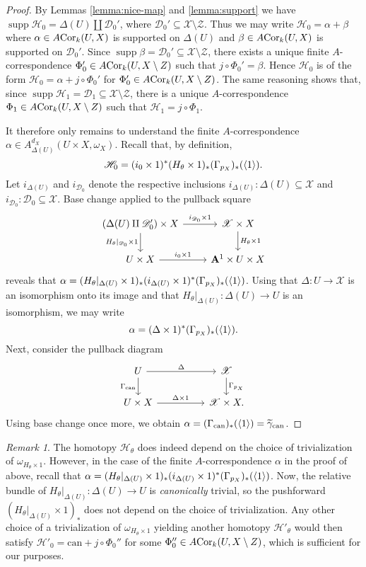\documentclass[a4paper, oneside, english,reqno]{amsart}
\DeclarePairedDelimiter{\ip}{\langle}{\rangle}
\theoremstyle{plain}
\theoremstyle{definition}
\theoremstyle{remark}
\newtheorem{remark}[theorem]{Remark}
\newcommand{\wt}{\widetilde}
\newcommand{\ACor}{A\mkern-3mu\Cor}
\newcommand{\A}{\mathbf{A}}
\newcommand{\scrD}{\mathscr{D}}
\newcommand{\scrH}{\mathscr{H}}
\newcommand{\scrX}{\mathscr{X}}
\newcommand{\scrZ}{\mathscr{Z}}
\newcommand{\can}{\mathrm{can}}
\DeclareMathOperator{\supp}{supp}
\DeclareMathOperator{\Cor}{Cor}
\begin{document}
\begin{proof}
By Lemmas \ref{lemma:nice-map} and \ref{lemma:support} we have $\supp\scrH_0=\Delta(U)\amalg\scrD_0'$, where $\scrD_0'\subseteq\scrX\setminus\scrZ$. Thus we may write $\scrH_0=\alpha+\beta$ where $\alpha\in\ACor_k(U,X)$ is supported on $\Delta(U)$ and $\beta\in\ACor_k(U,X)$ is supported on $\scrD_0'$. Since $\supp\beta=\scrD_0'\subseteq\scrX\setminus\scrZ$, there exists  a unique finite $A$-correspondence  $\Phi_0'\in\ACor_k(U,X\setminus Z)$ such that $j\circ\Phi_0'=\beta$. Hence $\scrH_0$ is of the form $\scrH_0=\alpha+j\circ\Phi_0'$ for $\Phi_0'\in\ACor_k(U,X\setminus Z)$. The same reasoning shows that, since $\supp\scrH_1= \scrD_1\subseteq\scrX\setminus\scrZ$, there is a unique $A$-correspondence $\Phi_1\in\ACor_k(U,X\setminus Z)$ such that $\scrH_1=j\circ\Phi_1$. 

It therefore only remains to understand the finite $A$-correspondence $\alpha\in A_{\Delta(U)}^{d_X}(U\times X,\omega_{X})$. Recall that, by definition, 
\[
\scrH_0=(i_0\times1)^*(H_\theta\times1)_*(\Gamma_{p_X})_*(\ip1).
\]
Let $i_{\Delta(U)}$ and $i_{\scrD_0}$ denote the respective inclusions $i_{\Delta(U)}\colon\Delta(U)\subseteq \scrX$ and $i_{\scrD_0}\colon\scrD_0\subseteq\scrX$. Base change applied to the pullback square
\[\begin{tikzcd}
(\Delta(U)\amalg\scrD_0')\times X\ar{r}{i_{\scrD_0}\times1}\ar{d}[swap]{H_\theta|_{\scrD_0}\times1} & \scrX\times X\ar{d}{H_\theta\times1}\\
U\times X\ar{r}{i_0\times1} & \A^1\times U\times X
\end{tikzcd}\]
reveals that $\alpha=(H_\theta|_{\Delta(U)}\times1)_*(i_{\Delta(U)}\times1)^*(\Gamma_{p_X})_*(\ip1)$. Using that $\Delta\colon U\to\scrX$ is an isomorphism onto its image and that $H_\theta|_{\Delta(U)}\colon\Delta(U)\to U$ is an isomorphism, we may write 
\[\alpha=(\Delta\times1)^*(\Gamma_{p_X})_*(\ip1).\] 
Next, consider the pullback diagram
\[\begin{tikzcd}
U\ar{rr}{\Delta}\ar{d}[swap]{\Gamma_\can} & & \scrX\ar{d}{\Gamma_{p_X}}\\
U\times X\ar{rr}{\Delta\times1} & &\scrX\times X.
\end{tikzcd}\]
Using base change once more, we obtain $\alpha=(\Gamma_\can)_*(\ip1)=\wt\gamma_\can$.
\end{proof}

\begin{remark}
The homotopy $\scrH_\theta$ does indeed depend on the choice of trivialization of $\omega_{H_\theta\times1}$. However, in the case of the finite $A$-correspondence $\alpha$ in the proof of  above, recall that $\alpha=(H_{\theta}|_{\Delta(U)}\times1)_*(i_{\Delta(U)}\times1)^*(\Gamma_{p_X})_*(\ip1)$. Now, the relative bundle of $H_\theta|_{\Delta(U)}\colon\Delta(U)\to U$ is \emph{canonically} trivial, so the pushforward $(H_\theta|_{\Delta(U)}\times1)_*$ does not depend on the choice of trivialization. Any other choice of a trivialization of $\omega_{H_\theta\times1}$ yielding another homotopy $\scrH'_\theta$ would then satisfy $\scrH'_0=\can+j\circ\Phi_0''$ for some $\Phi_0''\in\ACor_k(U,X\setminus Z)$, which is sufficient for our purposes.
\end{remark}
\end{document}
